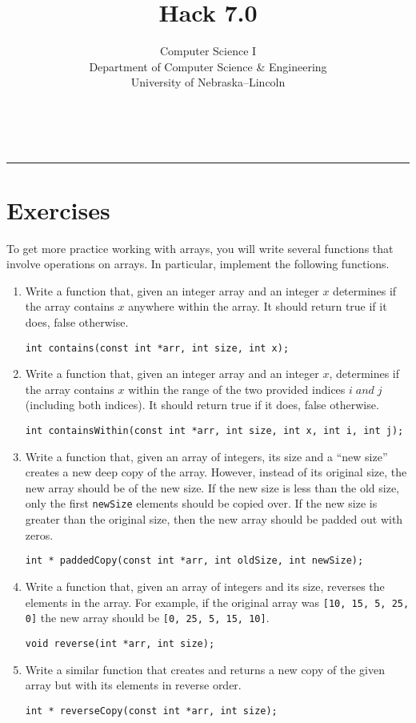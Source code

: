 \documentclass[12pt]{scrartcl}
\title{Hack 7.0}\let\Title\@title
\subtitle{Computer Science I\\
{\small
\vskip1cm
Department of Computer Science \& Engineering \\
University of Nebraska--Lincoln}
\vskip-1cm}
\date{~}
\begin{document}
\maketitle

\hrule



\section*{Exercises}

To get more practice working with arrays, you will write several 
functions that involve operations on arrays.  In particular, implement
the following functions.

\begin{enumerate}

  \item Write a function that, given an integer array and an integer 
  $x$ determines if the array contains $x$ anywhere within the array.
  It should return true if it does, false otherwise.
  
  \texttt{int contains(const int *arr, int size, int x);}

  \item Write a function that, given an integer array and an integer 
  $x$, determines if the array contains $x$ within the range of the two provided indices $ i\;and\; j $ (including both indices).
  It should return true if it does, false otherwise.

  
  \texttt{int containsWithin(const int *arr, int size, int x, int i, int j);}
  
  \item Write a function that, given an array of integers, its size and a
  ``new size'' creates a new deep copy of the array.  However, instead of
  its original size, the new array should be of the new size.  If the new
  size is less than the old size, only the first \texttt{newSize} 
  elements should be copied over.  If the new size is greater than the original
  size, then the new array should be padded out with zeros.
  
  \texttt{int * paddedCopy(const int *arr, int oldSize, int newSize);}

  \item Write a function that, given an array of integers and its size, 
  reverses the elements in the array.  For example, if the original array
  was \texttt{[10, 15, 5, 25, 0]} the new array should be 
  \texttt{[0, 25, 5, 15, 10]}.
  
  \texttt{void reverse(int *arr, int size);}

  \item Write a similar function that creates and returns a new copy of 
  the given array but with its elements in reverse order. 
  
  \texttt{int * reverseCopy(const int *arr, int size);}

\end{enumerate}
\end{document}
